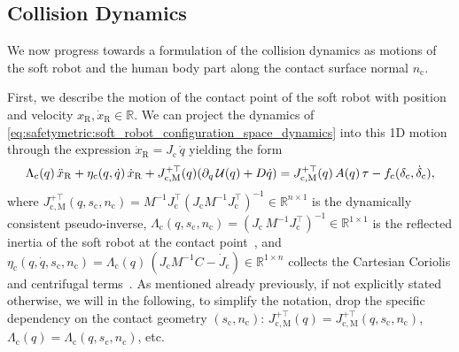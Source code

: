 \subsection{Collision Dynamics}
We now progress towards a formulation of the collision dynamics as motions of the soft robot and the human body part along the contact surface normal $n_\mathrm{c}$.

First, we describe the motion of the contact point of the soft robot with position and velocity $x_\mathrm{R}, \dot{x}_\mathrm{R} \in \mathbb{R}$.
We can project the dynamics of \eqref{eq:safetymetric:soft_robot_configuration_space_dynamics} into this 1D motion through the expression $\dot{x}_\mathrm{R} = J_\mathrm{c} \, \dot{q}$ yielding the form~\citep{khatib1987unified, della2019exact, della2020model, stolzle2024guiding}
\begin{equation}
    \Lambda_\mathrm{c}(q) \, \Ddot{x}_\mathrm{R} + \eta_\mathrm{c}(q,\dot{q}) \, \dot{x}_\mathrm{R} + J_\mathrm{c,M}^{+\top}(q) ( \partial_{q} \, \mathcal{U}(q) + D \dot{q} ) = J_\mathrm{c,M}^{+\top}(q) \, A(q) \, \tau - f_{\mathrm{c}}(\delta_\mathrm{c}, \dot{\delta}_\mathrm{c}),
\end{equation}
where $J_\mathrm{c,M}^{+\top}(q, s_\mathrm{c},n_\mathrm{c}) = M^{-1}J_\mathrm{c}^\top(J_\mathrm{c} M^{-1} J_\mathrm{c}^\top)^{-1} \in \mathbb{R}^{n \times 1}$ is the dynamically consistent pseudo-inverse, $\Lambda_\mathrm{c}(q, s_\mathrm{c},n_\mathrm{c}) = (J_\mathrm{c} \, M^{-1} J_\mathrm{c}^\top)^{-1} \in \mathbb{R}^{1 \times 1}$ is the reflected inertia of the soft robot at the contact point~\citep{haddadin2009requirements, iso2016collaborative}, and $\eta_\mathrm{c}(q,\dot{q},s_\mathrm{c},n_\mathrm{c}) = \Lambda_\mathrm{c}(q) \, (J_\mathrm{c} M^{-1} C - \dot{J}_\mathrm{c}) \in \mathbb{R}^{1 \times n}$ collects the Cartesian Coriolis and centrifugal terms~\citep{khatib1987unified}.
As mentioned already previously, if not explicitly stated otherwise, we will in the following, to simplify the notation, drop the specific dependency on the contact geometry $(s_\mathrm{c}, n_\mathrm{c})$: $J_\mathrm{c,M}^{+\top}(q) = J_\mathrm{c,M}^{+\top}(q,s_\mathrm{c},n_\mathrm{c})$, $\Lambda_\mathrm{c}(q) = \Lambda_\mathrm{c}(q,s_\mathrm{c},n_\mathrm{c})$, etc.

